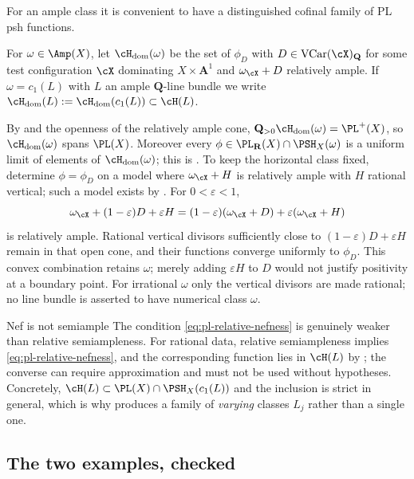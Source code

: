 For an ample class it is convenient to have a distinguished cofinal family
of PL psh functions.

\begin{definition}
\label{def:ch34-hdom}
For $\omega\in\Amp(X)$, let $\cH_{\mathrm{dom}}(\omega)$ be the set of
$\phi_D$ with $D\in\operatorname{VCar}(\cX)_{\mathbf Q}$ for some test
configuration $\cX$ dominating $X\times\mathbf A^1$ and
$\omega_{\cX}+D$ relatively ample.  If $\omega=c_1(L)$ with $L$ an
ample $\mathbf Q$-line bundle we write
$\cH_{\mathrm{dom}}(L):=\cH_{\mathrm{dom}}(c_1(L))\subset\cH(L)$.
\end{definition}

By  and the openness of the relatively ample
cone, $\mathbf Q_{>0}\cH_{\mathrm{dom}}(\omega)=\PL^+(X)$, so
$\cH_{\mathrm{dom}}(\omega)$ spans $\PL(X)$.  Moreover every
$\phi\in\PL_{\mathbf R}(X)\cap\PSH_X(\omega)$ is a uniform limit of
elements of $\cH_{\mathrm{dom}}(\omega)$; this is
\cite[Proposition~3.10]{BJ22}.
To keep the horizontal class fixed, determine $\phi=\phi_D$ on a model
where $\omega_{\cX}+H$ is relatively ample with $H$ rational vertical;
such a model exists by \cite[Lemma~3.11]{BJ22}.
For $0<\varepsilon<1$,
\[
 \omega_{\cX}+(1-\varepsilon)D+\varepsilon H
 =(1-\varepsilon)(\omega_{\cX}+D)
   +\varepsilon(\omega_{\cX}+H)
\]
is relatively ample.  Rational vertical divisors sufficiently close to
$(1-\varepsilon)D+\varepsilon H$ remain in that open cone, and their
functions converge uniformly to $\phi_D$.
This convex combination retains $\omega$; merely adding
$\varepsilon H$ to $D$ would not justify positivity at a boundary
point.  For irrational $\omega$ only the vertical divisors are made
rational; no line bundle is asserted to have numerical class $\omega$.

\begin{warning}{Nef is not semiample}
The condition \eqref{eq:pl-relative-nefness} is genuinely weaker than
relative semiampleness.  For rational data, relative semiampleness implies
\eqref{eq:pl-relative-nefness}, and the corresponding function lies in
$\cH(L)$ by ; the converse can require
approximation and must not be used without hypotheses.  Concretely,
$\cH(L)\subset\PL(X)\cap\PSH_X(c_1(L))$ and the inclusion is strict in
general, which is why  produces a family
of \emph{varying} classes $L_j$ rather than a single one.
\end{warning}

\subsection{The two examples, checked}

